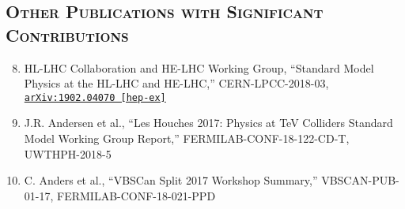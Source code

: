 \documentclass[10pt]{res} %
\begin{document}
\begin{resume}
\section{\textsc{Other Publications with Significant Contributions}}
\begin{enumerate}
  \setcounter{enumi}{7}
  \item HL-LHC Collaboration and HE-LHC Working Group, ``Standard Model Physics at the HL-LHC and HE-LHC,''
    CERN-LPCC-2018-03, \href{https://arxiv.org/abs/1902.04070} {\texttt{arXiv:1902.04070 [hep-ex]}}
  \item J.R. Andersen et al., ``Les Houches 2017: Physics at TeV Colliders Standard Model Working Group Report,''
    FERMILAB-CONF-18-122-CD-T, UWTHPH-2018-5
  \item C. Anders et al., ``VBSCan Split 2017 Workshop Summary,'' 
    VBSCAN-PUB-01-17, FERMILAB-CONF-18-021-PPD
\end{enumerate}


\end{resume}
\end{document}
